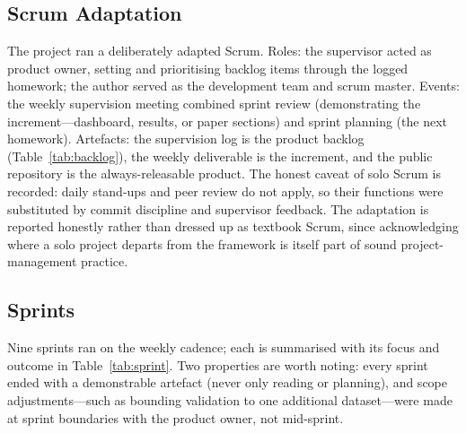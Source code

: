 \documentclass[11pt,a4paper]{article}
\begin{document}
\subsection{Scrum Adaptation}
The project ran a deliberately adapted Scrum. Roles: the supervisor acted as
product owner, setting and prioritising backlog items through the logged
homework; the author served as the development team and scrum master. Events:
the weekly supervision meeting combined sprint review (demonstrating the
increment---dashboard, results, or paper sections) and sprint planning (the next
homework). Artefacts: the supervision log is the product backlog
(Table~\ref{tab:backlog}), the weekly deliverable is the increment, and the public
repository is the always-releasable product. The honest caveat of solo Scrum is
recorded: daily stand-ups and peer review do not apply, so their functions were
substituted by commit discipline and supervisor feedback. The adaptation is reported honestly rather than dressed up as textbook Scrum, since acknowledging where a solo project departs from the framework is itself part of sound project-management practice.

\subsection{Sprints}
Nine sprints ran on the weekly cadence; each is summarised with its focus and
outcome in Table~\ref{tab:sprint}. Two properties are worth noting: every sprint ended
with a demonstrable artefact (never only reading or planning), and scope
adjustments---such as bounding validation to one additional dataset---were made
at sprint boundaries with the product owner, not mid-sprint.
\end{document}
